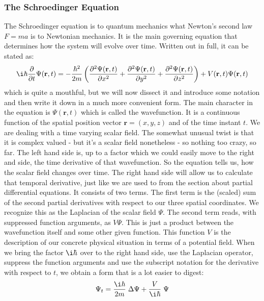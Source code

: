 \subsubsection{The Schroedinger Equation}
The  Schroedinger equation is to quantum mechanics what Newton's second law $F = m a$ is to Newtonian mechanics. It is the main governing equation that determines how the system will evolve over time. Written out in full, it can be stated as:
\begin{equation}
 \i \hbar \frac{\partial}{\partial t} \Psi(\mathbf{r}, t) =
 - \frac{\hbar^2}{2m} \left(
 \frac{\partial^2 \Psi(\mathbf{r}, t)}{\partial x^2} + 
 \frac{\partial^2 \Psi(\mathbf{r}, t)}{\partial y^2} + 
 \frac{\partial^2 \Psi(\mathbf{r}, t)}{\partial z^2}
 \right)
 +
 V(\mathbf{r}, t) \Psi(\mathbf{r}, t)
\end{equation}
which is quite a mouthful, but we will now dissect it and introduce some notation and then write it down in a much more convenient form. The main character in the equation is $\Psi(\mathbf{r}, t)$ which is called the wavefunction. It is a continuous function of the spatial position vector $\mathbf{r} = (x,y,z)$ and of the time instant $t$. We are dealing with a time varying scalar field. The somewhat unusual twist is that it is complex valued - but it's a scalar field nonetheless - so nothing too crazy, so far. The left hand side is, up to a factor which we could easily move to the right and side, the time derivative of that wavefunction. So the equation tells us, how the scalar field changes over time. The right hand side will allow us to calculate that temporal derivative, just like we are used to from the section about partial differential equations. It consists of two terms. The first term is the (scaled) sum of the second partial derivatives with respect to our three spatial coordinates. We recognize this as the Laplacian of the scalar field $\Psi$. The second term reads, with suppressed function arguments, as $V \Psi$. This is just a product between the wavefunction itself and some other given function. This function $V$ is the description of our concrete physical situation in terms of a potential field. When we bring the factor $\i \hbar$ over to the right hand side, use the Laplacian operator, suppress the function arguments and use the subscript notation for the derivative with respect to $t$, we obtain a form that is a lot easier to digest:
\begin{equation}
\Psi_t = \frac{\i \hbar}{2m} \; \Delta \Psi + \frac{V}{\i \hbar} \; \Psi
\end{equation}


